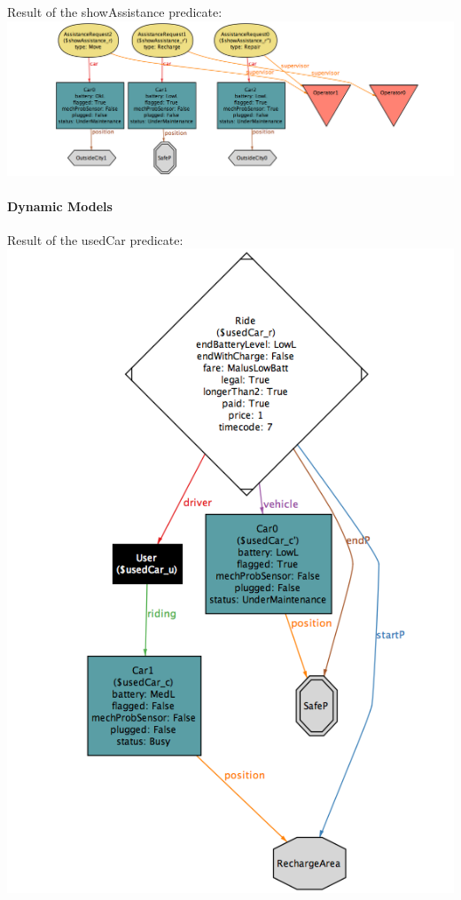\documentclass[]{article}
\let\oldparagraph\paragraph
\renewcommand{\paragraph}[1]{\oldparagraph{#1}\mbox{}}
\begin{document}
Result of the showAssistance predicate:\newline
\includegraphics[width=1.00000\textwidth,height=1.00000\textwidth]{./alloyworlds/showAssistance.png}

\newpage

\paragraph{Dynamic Models}\label{dynamic-models}

Result of the usedCar predicate:\newline
\includegraphics[width=1.00000\textwidth,height=1.00000\textwidth]{./alloyworlds/usedCar.png}
\end{document}
